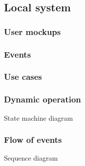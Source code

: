 %
\subsection{Local system}
\label{sec:local-system}

\subsubsection{User mockups}
\label{sec:user-mockups}

\subsubsection{Events}
\label{sec:events}

\subsubsection{Use cases}
\label{sec:use-cases}

\subsubsection{Dynamic operation}
\label{sec:dyn-oper}
State machine diagram

\subsubsection{Flow of events}
\label{sec:flow-events}
Sequence diagram


